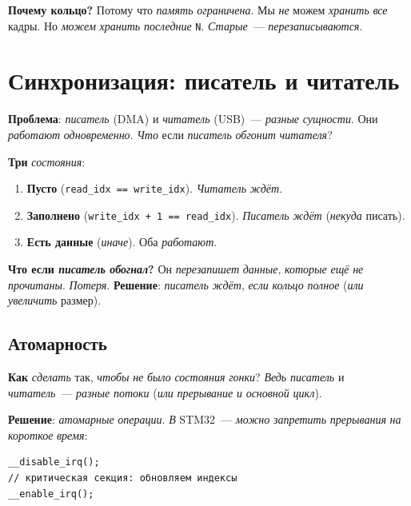 \begin{keybox}
\textbf{Почему кольцо?} Потому что \emph{память}
\emph{ограничена}. Мы \emph{не} можем \emph{хранить}
\emph{все} кадры. Но \emph{можем} \emph{хранить}
\emph{последние} \texttt{N}. \emph{Старые}~---
\emph{перезаписываются}.
\end{keybox}

\section{Синхронизация: писатель и читатель}
\label{sec:ring-sync}

\textbf{Проблема}: \emph{писатель} (DMA) и \emph{читатель}
(USB)~--- \emph{разные} \emph{сущности}. Они \emph{работают}
\emph{одновременно}. \emph{Что} если \emph{писатель}
\emph{обгонит} \emph{читателя}?

\textbf{Три} \emph{состояния}:
\begin{enumerate}
    \item \textbf{Пусто} (\texttt{read\_idx == write\_idx}).
          \emph{Читатель} \emph{ждёт}.
    \item \textbf{Заполнено} (\texttt{write\_idx + 1 == read\_idx}).
          \emph{Писатель} \emph{ждёт} (\emph{некуда} писать).
    \item \textbf{Есть данные} (\emph{иначе}). Оба
          \emph{работают}.
\end{enumerate}

\begin{warnbox}
\textbf{Что если \emph{писатель} \emph{обогнал}?}
Он \emph{перезапишет} \emph{данные}, \emph{которые}
\emph{ещё} \emph{не} \emph{прочитаны}. \emph{Потеря}.
\textbf{Решение}: \emph{писатель} \emph{ждёт}, \emph{если}
\emph{кольцо} \emph{полное} (\emph{или} \emph{увеличить}
размер).
\end{warnbox}

\subsection{Атомарность}

\textbf{Как} \emph{сделать} так, \emph{чтобы} \emph{не}
\emph{было} \emph{состояния} \emph{гонки}? \emph{Ведь}
\emph{писатель} и \emph{читатель}~--- \emph{разные}
\emph{потоки} (\emph{или} \emph{прерывание} \emph{и}
\emph{основной} \emph{цикл}).

\textbf{Решение}: \emph{атомарные} \emph{операции}.
\emph{В} STM32~--- \emph{можно} \emph{запретить}
\emph{прерывания} \emph{на} \emph{короткое} \emph{время}:
\begin{listing}[htbp]
\begin{verbatim}
__disable_irq();
// критическая секция: обновляем индексы
__enable_irq();
\end{verbatim}
\caption{Критическая секция}
\label{lst:ring-critical}
\end{listing}

